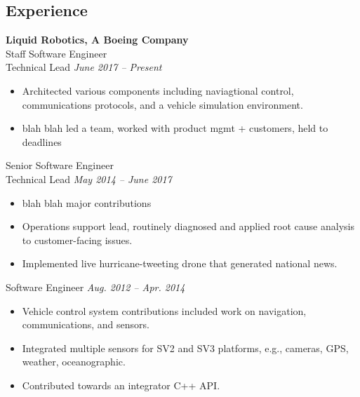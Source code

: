 \documentclass{article}
\begin{document}
{\begin{multicols}{2}
\section*{Experience}
\noindent
    \textbf{Liquid Robotics, A Boeing Company}\\
    Staff Software Engineer\\
    Technical Lead \hfill \textsl{June 2017 -- Present} \\
    \vspace{ -10px}
    \begin{itemize}[noitemsep,nolistsep]
        \item Architected various components including naviagtional control, communications protocols, and a vehicle simulation environment.
        \item blah blah led a team, worked with product mgmt + customers, held to deadlines
    \end{itemize}
    \vspace{10px}
    Senior Software Engineer\\
    Technical Lead \hfill \textsl{May 2014 -- June 2017} \\
    \vspace{ -10px}
    \begin{itemize}[noitemsep,nolistsep]
    	\item blah blah major contributions
         \item Operations support lead, routinely diagnosed and applied root cause analysis to customer-facing issues.
         \item Implemented live hurricane-tweeting drone that generated national news.
    \end{itemize}
    \vspace{10px}
    Software Engineer \hfill \textsl{Aug. 2012 -- Apr. 2014}\\
    \vspace{ -10px}
    \begin{itemize}[noitemsep,nolistsep]
        \item Vehicle control system contributions included work on navigation, communications, and sensors.
        \item Integrated multiple sensors for SV2 and SV3 platforms, e.g., cameras, GPS, weather, oceanographic.
        \item Contributed towards an integrator C++ API.

\end{itemize}
\end{multicols}}
\end{document}
